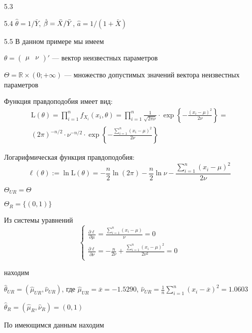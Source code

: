 \protect \hypertarget {soln:5.3}{}
\begin{solution}{{5.3}}
\end{solution}
\protect \hypertarget {soln:5.4}{}
\begin{solution}{{5.4}}
$\hat{\theta}=1/\bar{Y}$, $\hat{\beta}=\bar{X}/\bar{Y}$, $\hat{a}=1/(1+\bar{X})$
\end{solution}
\protect \hypertarget {soln:5.5}{}
\begin{solution}{{5.5}}
В данном примере мы имеем

$\theta = \begin{pmatrix}
\mu & \nu
\end{pmatrix}'$ — вектор неизвестных параметров

$\Theta = \mathbb{R} \times (0; +\infty)$ — множество допустимых значений вектора неизвестных параметров

Функция правдоподобия имеет вид:
\begin{multline*}
\text{L}(\theta) = \prod_{i=1}^n f_{X_i}(x_i, \theta) = \prod_{i=1}^n \frac{1}{\sqrt{2\pi\nu}} \cdot \exp\left\lbrace -\frac{(x_i - \mu)^2}{2\nu} \right\rbrace =\\
 (2\pi)^{-n/2} \cdot \nu^{-n/2} \cdot \exp \left\lbrace -\frac{\sum_{i=1}^n (x_i - \mu)^2}{2\nu} \right\rbrace
\end{multline*}

Логарифмическая функция правдоподобия:
\[
\ell(\theta) := \ln \text{L}(\theta) = -\frac{n}{2} \ln(2\pi) - \frac{n}{2} \ln\nu - \frac{\sum_{i=1}^n (x_i - \mu)^2}{2\nu}
\]

$\Theta_{UR} = \Theta$

$\Theta_{R} = \{(0,1)\}$

Из системы уравнений
\[
\begin{cases}
\frac{\partial \ell}{\partial \mu} = \frac{\sum_{i=1}^n (x_i - \mu)}{\nu} = 0 \\
\frac{\partial \ell}{\partial \nu} = -\frac{n}{2\nu} + \frac{\sum_{i=1}^n (x_i - \mu)^2}{2\nu^2} = 0 \\
\end{cases}
\]

находим

$\hat{\theta}_{UR} = (\hat{\mu}_{UR}, \hat{\nu}_{UR})$, где $\hat{\mu}_{UR} = \overline{x} = -1.5290$, $\hat{\nu}_{UR} = \frac{1}{n} \sum_{i=1}^n (x_i - \overline{x})^2 = 1.0603$

$\hat{\theta}_{R} = (\hat{\mu}_{R}, \hat{\nu}_{R}) = (0,1)$

По имеющимся данным находим


\end{solution}
